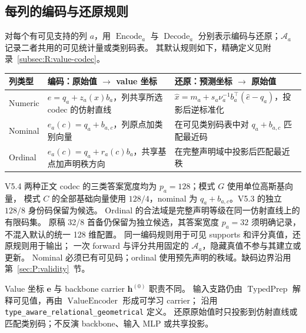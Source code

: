 \documentclass[11pt,UTF8,fontset=fandol]{ctexart}
\numberwithin{equation}{section}
\theoremstyle{definition}
\newcommand{\TypedPrep}{\operatorname{TypedPrep}}
\newcommand{\VE}{\operatorname{ValueEncoder}}
\begin{document}
\subsection{每列的编码与还原规则}

对每个有可见支持的列 $a$，用 $\operatorname{Encode}_a$ 与 $\operatorname{Decode}_a$
分别表示编码与还原；$\mathcal A_a$ 记录二者共用的可见统计量或类别码表。
其默认规则如下，精确定义见附录~\ref{subsec:R:value-codec}。
\begin{center}
\small
\begin{tabularx}{\linewidth}{lXX}
\toprule
列类型 & 编码：原始值 $\to$ value 坐标 & 还原：预测坐标 $\to$ 原始值\\
\midrule
Numeric & $e=q_a+z_a(x)b_a$，列共享所选 codec 的仿射直线
        & $\widehat x=m_a+s_a\nu_a^{-1}b_a^\top(\widehat e-q_a)$，投影后逆标准化\\
Nominal & $e_a(c)=q_a+b_{a,c}$，列原点加类别向量
        & 在可见类别码表中对 $q_a+b_{a,c}$ 匹配最近码\\
Ordinal & $e_a(c)=q_a+r_a(c)b_a$，共享基点加声明秩方向
        & 在完整声明域中投影后匹配最近秩\\
\bottomrule
\end{tabularx}
\end{center}
V5.4 两种正文 codec 的三类答案宽度均为 $p_a=128$；模式 $G$ 使用单位高斯基向量，
模式 $C$ 的全部基础向量使用 $128/4$，nominal 为 $q_a+b_{a,c}$。V5.3 的独立 $128/8$ 身份码保留为候选。
Ordinal 的合法域是完整声明等级在同一仿射直线上的有限码集。
原稿 32/8 首备仍保留为独立候选，其答案宽度 $p_a=32$ 须明确记录，不混入默认的统一 128 维配置。
同一编码规则用于可见 supports 和评分真值，还原规则用于输出；
一次 forward 与评分共用固定的 $\mathcal A_a$，隐藏真值不参与其建立或更新。
Nominal 必须已有可见码；ordinal 使用预先声明的秩域。缺码边界沿用第~\ref{sec:P:validity}~节。

Value 坐标 $\bm e$ 与 backbone carrier $\bm h^{(0)}$ 职责不同。
输入支路仍由 $\TypedPrep$ 解释可见值，再由 $\VE$ 形成可学习 carrier；
沿用 \texttt{type\_aware\_relational\_geometrical} 定义。
还原原始值时只投影到仿射直线或匹配类别码；不反演 backbone、输入 MLP 或共享投影。
\end{document}
